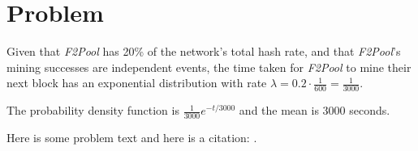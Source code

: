 \documentclass[11pt]{article}
\begin{document}
\section{Problem}

\begin{p}\end{p}
Given that \textit{F2Pool} has 20\% of the network's total hash rate, and that \textit{F2Pool}'s mining successes are independent events, the time taken for \textit{F2Pool} to mine their next block has an exponential distribution with rate $\lambda = 0.2 \cdot \frac{1}{600} = \frac{1}{3000}$.

The probability density function is $\frac{1}{3000}e^{-t/3000}$ and the mean is 3000 seconds.

Here is some problem text and here is a citation: \citep{somekey}.



\end{document}
